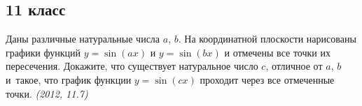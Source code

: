 \subsection*{11 класс}

\begin{problems}

\item
Даны различные натуральные числа $a$, $b$.
На координатной плоскости нарисованы графики функций
$y = \sin(ax)$ и $y = \sin(bx)$ и отмечены все точки их пересечения.
Докажите, что существует натуральное число $c$, отличное от $a$, $b$ и~такое,
что график функции $y = \sin(c x)$ проходит через все отмеченные точки.
\emph{(2012, 11.7)}

\end{problems}



